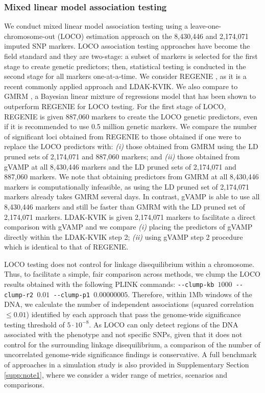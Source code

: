\subsubsection{Mixed linear model association testing}
We conduct mixed linear model association testing using a leave-one-chromosome-out (LOCO) estimation approach on the 8,430,446 and 2,174,071 imputed SNP markers. LOCO association testing approaches have become the field standard and they are two-stage: a subset of markers is selected for the first stage to create genetic predictors; then, statistical testing is conducted in the second stage for all markers one-at-a-time. We consider REGENIE \cite{regenie}, as it is a recent commonly applied approach and LDAK-KVIK\cite{hof2024ldak}. We also compare to GMRM \cite{Orliac2022}, a Bayesian linear mixture of regressions model that has been shown to outperform REGENIE for LOCO testing. For the first stage of LOCO, REGENIE is given 887,060 markers to create the LOCO genetic predictors, even if it is recommended to use 0.5 million genetic markers. We compare the number of significant loci obtained from REGENIE to those obtained if one were to replace the LOCO predictors with: \emph{(i)} those obtained from GMRM using the LD pruned sets of 2,174,071 and 887,060 markers; and \emph{(ii)} those obtained from gVAMP at all 8,430,446 markers and the LD pruned sets of 2,174,071 and 887,060 markers. We note that obtaining predictors from GMRM at all 8,430,446 markers is computationally infeasible, as using the LD pruned set of 2,174,071 markers already takes GMRM several days. In contrast, gVAMP is able to use all 8,430,446 markers and still be faster than GMRM with the LD pruned set of 2,174,071 markers. LDAK-KVIK is given 2,174,071 markers to facilitate a direct comparison with gVAMP and we compare \emph{(i)} placing the predictors of gVAMP directly within the LDAK-KVIK step 2; \emph{(ii)} using gVAMP step 2 procedure which is identical to that of REGENIE.

LOCO testing does not control for linkage disequilibrium within a chromosome. Thus, to facilitate a simple, fair comparison across methods, we clump the LOCO results obtained with the following PLINK commands: \texttt{-{}-clump-kb $1000$ -{}-clump-r2 $0.01$ -{}-clump-p1 $0.00000005$}. Therefore, within 1Mb windows of the DNA, we calculate the number of independent associations (squared correlation $\leq 0.01$) identified by each approach that pass the genome-wide significance testing threshold of $5 \cdot 10^{-8}$. As LOCO can only detect regions of the DNA associated with the phenotype and not specific SNPs, given that it does not control for the surrounding linkage disequilibrium, a comparison of the number of uncorrelated genome-wide significance findings is conservative. A full benchmark of approaches in a simulation study is also provided in Supplementary Section \ref{supp:note1}, where we consider a wider range of metrics, scenarios and comparisons.

